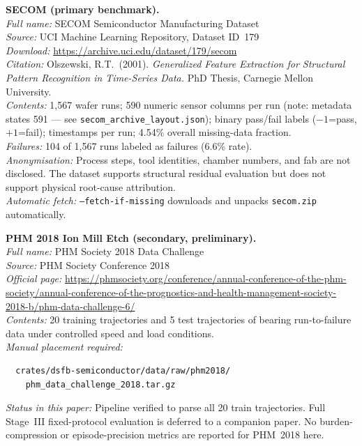 \documentclass[11pt,letterpaper]{article}
\theoremstyle{scresult}
\begin{document}
\medskip
\noindent\textbf{SECOM (primary benchmark).}\\
\textit{Full name:} SECOM Semiconductor Manufacturing Dataset\\
\textit{Source:} UCI Machine Learning Repository, Dataset ID~179\\
\textit{Download:} \url{https://archive.uci.edu/dataset/179/secom}\\
\textit{Citation:} Olszewski, R.T.\ (2001).
\textit{Generalized Feature Extraction for Structural Pattern Recognition
in Time-Series Data.}  PhD Thesis, Carnegie Mellon University.\\
\textit{Contents:} 1,567 wafer runs; 590 numeric sensor columns per run
(note: metadata states 591 --- see \texttt{secom\_archive\_layout.json});
binary pass/fail labels ($-1$=pass, $+1$=fail); timestamps per run;
4.54\% overall missing-data fraction.\\
\textit{Failures:} 104 of 1,567 runs labeled as failures (6.6\% rate).\\
\textit{Anonymisation:} Process steps, tool identities, chamber numbers,
and fab are not disclosed.  The dataset supports structural residual
evaluation but does not support physical root-cause attribution.\\
\textit{Automatic fetch:} \texttt{--fetch-if-missing} downloads and unpacks
\texttt{secom.zip} automatically.

\medskip
\noindent\textbf{PHM 2018 Ion Mill Etch (secondary, preliminary).}\\
\textit{Full name:} PHM Society 2018 Data Challenge\\
\textit{Source:} PHM Society Conference 2018\\
\textit{Official page:}
\url{https://phmsociety.org/conference/annual-conference-of-the-phm-society/annual-conference-of-the-prognostics-and-health-management-society-2018-b/phm-data-challenge-6/}\\
\textit{Contents:} 20 training trajectories and 5 test trajectories of bearing
run-to-failure data under controlled speed and load conditions.\\
\textit{Manual placement required:}
\begin{verbatim}
  crates/dsfb-semiconductor/data/raw/phm2018/
    phm_data_challenge_2018.tar.gz
\end{verbatim}
\textit{Status in this paper:} Pipeline verified to parse all 20 train
trajectories.  Full Stage~III fixed-protocol evaluation is deferred to a
companion paper.  No burden-compression or episode-precision metrics are
reported for PHM~2018 here.
\end{document}
